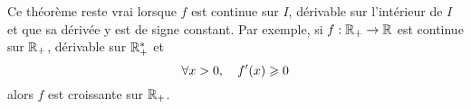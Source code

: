 \documentclass{magnoliaold}
\begin{document}
\begin{remarqueUnique}
\remarque Ce théorème reste vrai lorsque $f$ est continue sur $I$, dérivable sur
  l'intérieur de $I$ et que sa dérivée y est de signe constant. Par exemple, si
  $f:\mathbb{R}_+\to\mathbb{R}$ est continue sur $\mathbb{R}_+$, dérivable sur $\mathbb{R}_+^*$ et
  \[\forall x>0,\quad f'(x)\geqslant 0\]
  alors $f$ est croissante sur $\mathbb{R}_+$.
\end{remarqueUnique}

\end{document}
